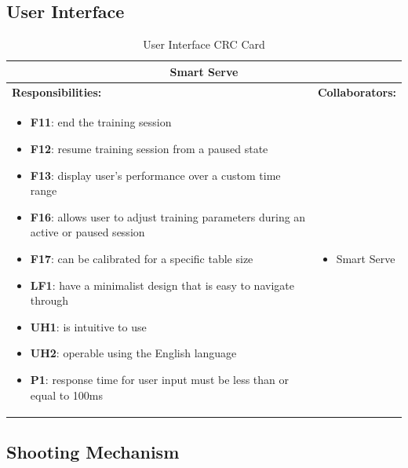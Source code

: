 \documentclass[11pt]{article}
\begin{document}
\subsection{User Interface}

\begin{table}[H]
\centering
\label{my-label}
\begin{tabular}{ | p{} | p{} | }
\hline
\multicolumn{2}{|c|}{\textbf{Smart Serve}}             \\ \hline
\textbf{Responsibilities:} & \textbf{Collaborators:} \\ \hline
\begin{itemize} 
\item \textbf{F11}: end the training session
\item \textbf{F12}: resume training session from a paused state
\item \textbf{F13}: display user's performance over a custom time range
\item \textbf{F16}: allows user to adjust training parameters during an active or paused session
\item \textbf{F17}: can be calibrated for a specific table size
\item \textbf{LF1}: have a minimalist design that is easy to navigate through
\item \textbf{UH1}: is intuitive to use
\item \textbf{UH2}: operable using the English language
\item \textbf{P1}: response time for user input must be less than or equal to 100ms
\end{itemize} 
& 
\begin{itemize} 
\item Smart Serve
\end{itemize} \\ \hline
\end{tabular}
\caption{User Interface CRC Card}
\end{table}

\subsection{Shooting Mechanism}
\end{document}
